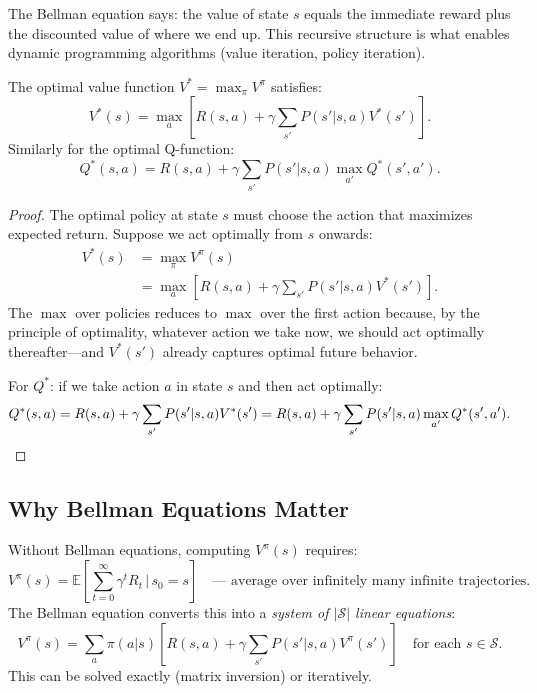 \begin{remark}[Intuition]
    The Bellman equation says: the value of state $s$ equals the immediate reward plus the discounted value of where we end up. This recursive structure is what enables dynamic programming algorithms (value iteration, policy iteration).
\end{remark}

\begin{proposition}
    The optimal value function $V^* = \max_\pi V^\pi$ satisfies:
    \[
        V^*(s) = \max_{a} \left[ R(s,a) + \gamma \sum_{s'} P(s'|s,a) V^*(s') \right].
    \]
    Similarly for the optimal Q-function:
    \[
        Q^*(s,a) = R(s,a) + \gamma \sum_{s'} P(s'|s,a) \max_{a'} Q^*(s', a').
    \]
\end{proposition}

\begin{proof}
    The optimal policy at state $s$ must choose the action that maximizes expected return. Suppose we act optimally from $s$ onwards:
    \begin{align*}
        V^*(s) & = \max_\pi V^\pi(s)                                                  \\
               & = \max_a \left[ R(s,a) + \gamma \sum_{s'} P(s'|s,a) V^*(s') \right].
    \end{align*}
    The $\max$ over policies reduces to $\max$ over the first action because, by the principle of optimality, whatever action we take now, we should act optimally thereafter---and $V^*(s')$ already captures optimal future behavior.

    For $Q^*$: if we take action $a$ in state $s$ and then act optimally:
    \[
        Q^*(s,a) = R(s,a) + \gamma \sum_{s'} P(s'|s,a) V^*(s') = R(s,a) + \gamma \sum_{s'} P(s'|s,a) \max_{a'} Q^*(s', a'). \qedhere
    \]
\end{proof}

\subsection{Why Bellman Equations Matter}

\begin{remark}
    Without Bellman equations, computing $V^\pi(s)$ requires:
    \[
        V^\pi(s) = \mathbb{E}\left[ \sum_{t=0}^{\infty} \gamma^t R_t \,\Big|\, s_0 = s \right] \quad \text{--- average over infinitely many infinite trajectories.}
    \]
    The Bellman equation converts this into a \emph{system of $|\mathcal{S}|$ linear equations}:
    \[
        V^\pi(s) = \sum_{a} \pi(a|s) \left[ R(s,a) + \gamma \sum_{s'} P(s'|s,a) V^\pi(s') \right] \quad \text{for each } s \in \mathcal{S}.
    \]
    This can be solved exactly (matrix inversion) or iteratively.
\end{remark}

